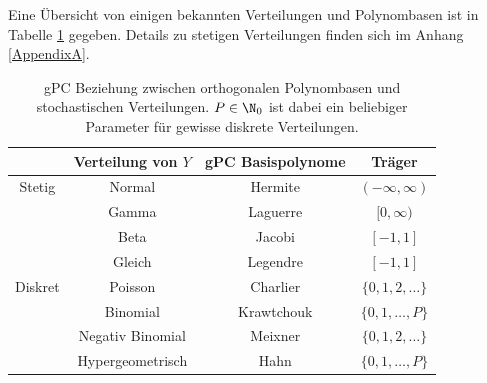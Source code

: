 Eine Übersicht von einigen bekannten Verteilungen und Polynombasen ist in Tabelle \ref{table:chaos} gegeben. Details zu stetigen Verteilungen finden sich im Anhang \ref{AppendixA}.\\
\begin{table}
\centering
\begin{tabular}{c|ccc}
 & Verteilung von $Y$ & gPC Basispolynome & Träger \\ 
\hline 
Stetig & Normal & Hermite & $(-\infty,\infty)$ \\ 
 & Gamma & Laguerre & $[0,\infty)$ \\ 
 & Beta & Jacobi & $[-1,1]$ \\
 & Gleich & Legendre & $[-1,1]$ \\  
\hline 
Diskret & Poisson & Charlier & $\lbrace 0,1,2,\dots\rbrace$ \\ 
 & Binomial & Krawtchouk & $\lbrace 0,1,\dots,P\rbrace$ \\ 
 & Negativ Binomial & Meixner & $\lbrace 0,1,2,\dots\rbrace$ \\  
 & Hypergeometrisch & Hahn & $\lbrace 0,1,\dots,P\rbrace$
\end{tabular}
\caption{gPC Beziehung zwischen orthogonalen Polynombasen und stochastischen Verteilungen. $P\in\N_0$ ist dabei ein beliebiger Parameter für gewisse diskrete Verteilungen.}
\label{table:chaos}
\end{table}


